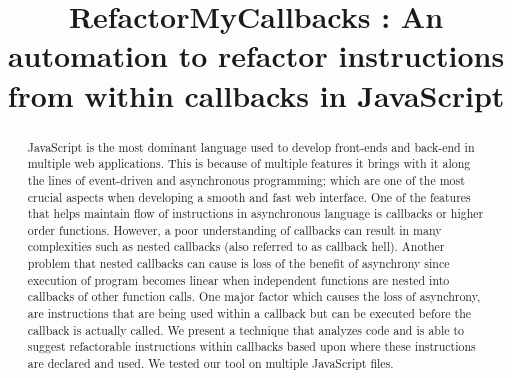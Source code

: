 \documentclass[10pt,conference]{IEEEtran}
\begin{document}
\title{RefactorMyCallbacks : An automation to refactor
instructions from within callbacks in JavaScript\\
}
\author{
\and
{}
\and
{}
}

\maketitle

\begin{abstract}
JavaScript is the most dominant language used to develop front-ends and back-end in multiple web applications. This is because of multiple features it brings with it along the lines of event-driven and asynchronous programming; which are one of the most crucial aspects when developing a smooth and fast web interface. One of the features that helps maintain flow of instructions in asynchronous language is callbacks or higher order functions. However, a poor understanding of callbacks can result in many complexities such as nested callbacks (also referred to as callback hell). Another problem that nested callbacks can cause is loss of the benefit of asynchrony since execution of program becomes linear when independent functions are nested into callbacks of other function calls. One major factor which causes the loss of asynchrony, are instructions that are being used within a callback but can be executed before the callback is actually called. We present a technique that analyzes code and is able to suggest refactorable instructions within callbacks based upon where these instructions are declared and used. We tested our tool on multiple JavaScript files.
\end{abstract}
\end{document}
